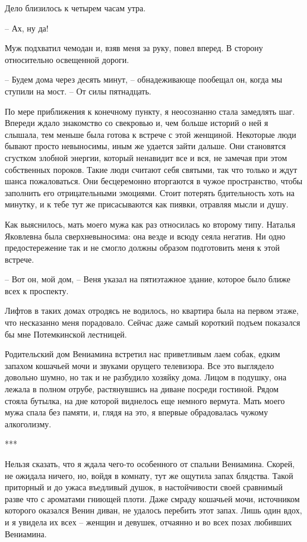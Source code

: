 \documentclass[
]{book}
\begin{document}
Дело близилось к четырем часам утра.

-- Ах, ну да!

Муж подхватил чемодан и, взяв меня за руку, повел вперед. В сторону относительно освещенной дороги.

-- Будем дома через десять минут, -- обнадеживающе пообещал он, когда мы ступили на мост. -- От силы пятнадцать.

По мере приближения к конечному пункту, я неосознанно стала замедлять шаг. Впереди ждало знакомство со свекровью и, чем больше историй о ней я слышала, тем меньше была готова к встрече с этой женщиной. Некоторые люди бывают просто невыносимы, иным же удается зайти дальше. Они становятся сгустком злобной энергии, который ненавидит все и вся, не замечая при этом собственных пороков. Такие люди считают себя святыми, так что только и ждут шанса пожаловаться. Они бесцеремонно вторгаются в чужое пространство, чтобы заполнить его отрицательными эмоциями. Стоит потерять бдительность хоть на минутку, и к тебе тут же присасываются как пиявки, отравляя мысли и душу.

Как выяснилось, мать моего мужа как раз относилась ко второму типу. Наталья Яковлевна была сверхневыносима: она везде и всюду сеяла негатив. Ни одно предостережение так и не смогло должны образом подготовить меня к этой встрече.

-- Вот он, мой дом, -- Веня указал на пятиэтажное здание, которое было ближе всех к проспекту.

Лифтов в таких домах отродясь не водилось, но квартира была на первом этаже, что несказанно меня порадовало. Сейчас даже самый короткий подъем показался бы мне Потемкинской лестницей.

Родительский дом Вениамина встретил нас приветливым лаем собак, едким запахом кошачьей мочи и звуками орущего телевизора. Все это выглядело довольно шумно, но так и не разбудило хозяйку дома. Лицом в подушку, она лежала в полном отрубе, растянувшись на диване посреди гостиной. Рядом стояла бутылка, на дне которой виднелось еще немного вермута. Мать моего мужа спала без памяти, и, глядя на это, я впервые обрадовалась чужому алкоголизму.

***

Нельзя сказать, что я ждала чего-то особенного от спальни Вениамина. Скорей, не ожидала ничего, но, войдя в комнату, тут же ощутила запах блядства. Такой приторный и до ужаса въедливый душок, в настойчивости своей сравнимый разве что с ароматами гниющей плоти. Даже смраду кошачьей мочи, источником которого оказался Венин диван, не удалось перебить этот запах. Лишь один вдох, и я увидела их всех -- женщин и девушек, отчаянно и во всех позах любивших Вениамина.
\end{document}
